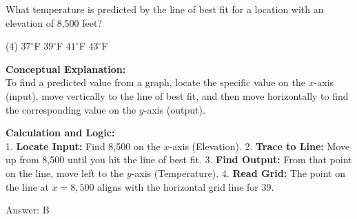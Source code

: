 \documentclass[11pt,paper=a4,answers]{exam}
\begin{document}
\begin{questions}
\vspace{60pt}

\question
\begin{center}
\end{center}
What temperature is predicted by the line of best fit for a location with an elevation of 8,500 feet?
\begin{tasks}(4)
    \task $37^\circ$F
    \task $39^\circ$F
    \task $41^\circ$F
    \task $43^\circ$F
\end{tasks}

\begin{solution}
\textbf{Conceptual Explanation:} \\
To find a predicted value from a graph, locate the specific value on the $x$-axis (input), move vertically to the line of best fit, and then move horizontally to find the corresponding value on the $y$-axis (output).

\vspace{30pt}

\textbf{Calculation and Logic:} \\
1. \textbf{Locate Input:} Find 8,500 on the $x$-axis (Elevation).
2. \textbf{Trace to Line:} Move up from 8,500 until you hit the line of best fit.
3. \textbf{Find Output:} From that point on the line, move left to the $y$-axis (Temperature).
4. \textbf{Read Grid:} The point on the line at $x = 8,500$ aligns with the horizontal grid line for 39.

\vspace{30pt}

Answer: \colorbox{yellow!100}{B}
\end{solution}

\vspace{60pt}


\end{questions}
\end{document}
